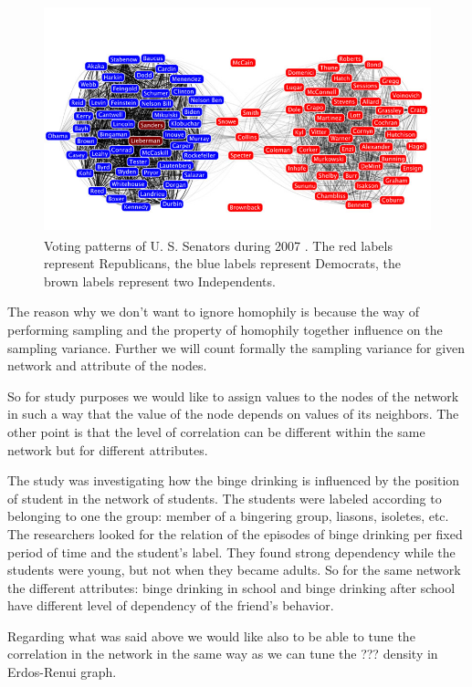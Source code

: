 \documentclass[12pt]{report}
\begin{document}
\begin{figure}[t]
    \centering
    \includegraphics[height = 250px]{senate}
    \caption{ Voting patterns of U. S. Senators during 2007 \cite{Senate}. The red labels represent Republicans, the blue labels represent Democrats, the brown labels represent two Independents.}
    \label{fig:senators}
\end{figure}


The reason why we don't want to ignore homophily is because the way of performing sampling and the property of homophily together influence on the sampling variance. Further we will count formally the sampling variance for given network and attribute of the nodes.

So for study purposes we would like to assign values to the nodes of the network in such a way that the value of the node depends on values of its neighbors.
The other point is that the level of correlation can be different within the same network but for different attributes. 

The study \cite{pollard2013adolescent} was investigating how the binge drinking is influenced by the position of student in the network of students. The students were labeled according to belonging to one the group: member of a bingering group, liasons, isoletes, etc. The researchers looked for the relation of the episodes of binge drinking per fixed period of time and the student's label. They found strong dependency while the students were young, but not when they became adults. So for the same network the different attributes: binge drinking in school and binge drinking after school have different level of dependency of the friend's behavior.

Regarding what was said above we would like also to be able to tune the correlation in the network in the same way as we can tune the ??? density in Erdos-Renui graph. 
\end{document}
